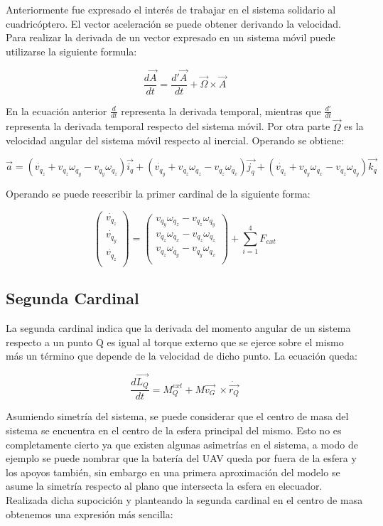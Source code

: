 \documentclass[main]{subfiles}
\begin{document}
Anteriormente fue expresado el inter\'es de trabajar en el sistema solidario al cuadric\'optero. 
El vector aceleraci\'on se puede obtener derivando la velocidad. Para realizar la derivada de un vector expresado en un sistema m\'ovil puede utilizarse la siguiente formula:

$$\frac{d\vec{A}}{dt} =\frac{d\prime\vec{A}}{dt}+\vec{\Omega}\times\vec{A} $$

En la ecuaci\'on anterior $\frac{d}{dt}$ representa la derivada temporal, mientras que $\frac{d\prime}{dt}$ representa la derivada temporal respecto del sistema m\'ovil. Por otra parte $\vec{\Omega}$ es la velocidad angular del sistema m\'ovil respecto al inercial. Operando se obtiene: 

$$\vec{a} = (\dot{v_{q_z}}+v_{q_z} \omega_{q_y} - v_{q_y} \omega_{q_z} )\vec{i_q} + (\dot{v_{q_y}}+v_{q_z} \omega_{q_z} - v_{q_z} \omega_{q_x} )\vec{j_q}+(\dot{v_{q_z}}+v_{q_y} \omega_{q_x} - v_{q_z} \omega_{q_y} )\vec{k_q} $$



Operando se puede reescribir la primer cardinal de la siguiente forma:

$$
\left(\begin{array}{c}\dot{v_{q_z}}\\
\dot{v_{q_y}}\\
\dot{v_{q_z}}\\
\end{array} \right) = \left(\begin{array}{c}
v_{q_y} \omega_{q_z} - v_{q_z} \omega_{q_y}	\\
v_{q_z} \omega_{q_x} - v_{q_z} \omega_{q_z}\\
v_{q_z} \omega_{q_y} - v_{q_y} \omega_{q_x}\\
\end{array}\right) + \sum_{i=1}^4 F_{ext} 
$$


\subsection{Segunda Cardinal}

La segunda cardinal indica que la derivada del momento angular de un sistema respecto a un punto Q es igual al torque externo que se ejerce sobre el mismo m\'as un t\'ermino que depende de la velocidad de dicho punto. La ecuaci\'on queda:

$$\frac{d\vec{L_Q}}{dt} =M_Q^{ext}+M\vec{v_G}\ \times \dot{\vec{r_Q}} $$

Asumiendo simetr\'ia del sistema, se puede considerar que el centro de masa del sistema se encuentra en el centro de la esfera principal del mismo. Esto no es completamente cierto ya que existen algunas asimetr\'ias en el sistema, a modo de ejemplo se puede nombrar que la bater\'ia del UAV queda por fuera de la esfera y los apoyos tambi\'en, sin embargo en una primera aproximaci\'on del modelo se asume la simetr\'ia respecto al plano que intersecta la esfera en elecuador. Realizada dicha supocici\'on y planteando la segunda cardinal en el centro de masa obtenemos una expresi\'on m\'as sencilla:
\end{document}
